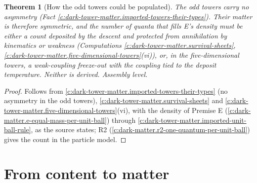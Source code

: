 \documentclass[11pt]{article}
\newtheorem{theorem}{Theorem}[section]
\theoremstyle{definition}
\theoremstyle{plain}
\newcommand{\changedmark}[2]{\marginpar{\raggedright\scriptsize\color{#1}#2}}
\begin{document}
\begin{theorem}[How the odd towers could be populated]\label{c:dark-tower-matter.population}
\changedmark{BurntOrange}{changed since the deposit}
The odd towers carry no asymmetry (Fact \ref{c:dark-tower-matter.imported-towers-their-types}). Their matter is therefore symmetric, and the number of quanta that fills E's density must be either a count deposited by the descent and protected from annihilation by kinematics or weakness (Computations \ref{c:dark-tower-matter.survival-sheets}, \ref{c:dark-tower-matter.five-dimensional-towers}(vi)), or, in the five-dimensional towers, a weak-coupling freeze-out with the coupling tied to the deposit temperature. Neither is derived. Assembly level.
\end{theorem}
\begin{proof}
Follows from \ref{c:dark-tower-matter.imported-towers-their-types} (no asymmetry in the odd towers), \ref{c:dark-tower-matter.survival-sheets} and \ref{c:dark-tower-matter.five-dimensional-towers}(vi), with the density of Premise E (\ref{c:dark-matter.e-equal-mass-per-unit-ball}) through \ref{c:dark-tower-matter.imported-unit-ball-rule}, as the source states; R2 (\ref{c:dark-matter.r2-one-quantum-per-unit-ball}) gives the count in the particle model.

\end{proof}

\section{From content to matter}
\end{document}
